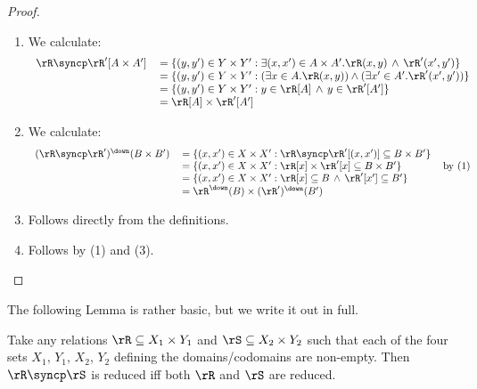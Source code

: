 \documentclass{article}
\begin{document}
\begin{proof}
\item
\begin{enumerate}
\item
We calculate:
\[
\begin{tabular}{lll}
$\rR \syncp \rR'[A \times A']$
& $= \{ (y,y') \in Y \times Y' : \exists (x,x') \in A \times A'. \rR(x,y) \,\land\, \rR'(x',y') \}$
\\&
$= \{ (y,y') \in Y \times Y' : (\exists x \in A. \rR(x,y)) \land (\exists x' \in A'. \rR'(x',y')) \}$
\\&
$= \{ (y,y') \in Y \times Y' : y \in \rR[A] \,\land\, y \in \rR'[A'] \}$
\\&
$=  \rR[A] \times \rR'[A']$
\end{tabular}
\]

\item
We calculate:
\[
\begin{tabular}{lll}
$(\rR \syncp \rR')^\down(B \times B')$
&
$= \{ (x,x') \in X \times X' : \rR \syncp \rR' [(x,x')] \subseteq B \times B' \}$
\\&
$= \{ (x,x') \in X \times X' : \rR[x] \times \rR'[x] \subseteq B \times B' \}$
& by (1)
\\&
$= \{ (x,x') \in X \times X' : \rR[x] \subseteq B \,\land\, \rR'[x'] \subseteq B' \}$
\\&
$= \rR^\down(B) \times (\rR')^\down(B')$
\end{tabular}
\]

\item
Follows directly from the definitions.
\item
Follows by (1) and (3).

\end{enumerate}
\end{proof}

The following Lemma is rather basic, but we write it out in full.

\begin{lemma}
\label{lem:syncp_reduced_char}
Take any relations $\rR \subseteq X_1 \times Y_1$ and $\rS \subseteq X_2 \times Y_2$ such that each of the four sets $X_1,\,Y_1,\,X_2,\,Y_2$ defining the domains/codomains are non-empty. Then $\rR \syncp \rS$ is reduced iff both $\rR$ and $\rS$ are reduced.
\end{lemma}
\end{document}
